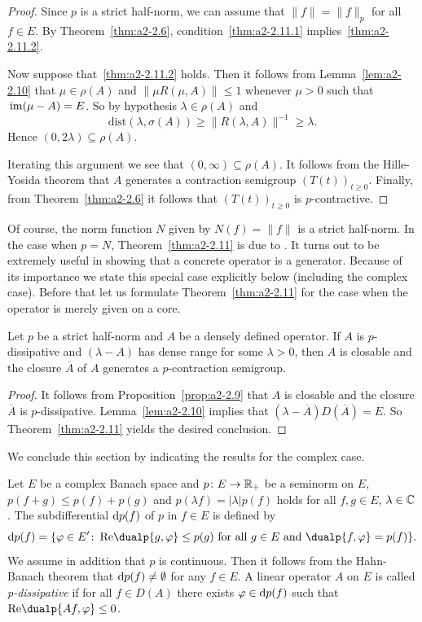\begin{proof}
Since $p$ is a strict half-norm, we can assume that $\|f\| = \|f\|_{p}$ for all $f \in E$.
By Theorem~\ref{thm:a2-2.6}, condition~\ref{thm:a2-2.11.1} implies~\ref{thm:a2-2.11.2}. 

Now suppose that~\ref{thm:a2-2.11.2}  holds.
Then it follows from Lemma~\ref{lem:a2-2.10}   
that $\mu \in \rho(A)$ and $\|\mu R(\mu,A)\| \leq 1$ whenever $\mu > 0$ such that $\mathop{}\mathrm{im}(\mu-A) = E$.
So by hypothesis $\lambda \in \rho(A)$ and 
%
\[
	\mathrm{dist}(\lambda,\sigma(A)) \geq \|R(\lambda,A)\|^{-1} \geq \lambda .
\]
%
Hence $(0,2\lambda) \subseteq \rho(A)$.

Iterating this argument we see that $(0,\infty) \subseteq \rho(A)$.
It follows from the Hille-Yosida theorem that $A$ generates a contraction semigroup $(T(t))_{t\geq 0}$.
Finally, from Theorem~\ref{thm:a2-2.6} it follows that $(T(t))_{t\geq 0}$ is $p$-contractive.
\end{proof}
Of course, the norm function $N$ given by $N(f) = \|f\|$ is a strict half-norm.
In the case when $p = N$, Theorem~\ref{thm:a2-2.11}    
is due to \textcite{lumerphillips:1961}.
It turns out to be extremely useful in showing that a concrete operator is a generator.
Because of its importance we state this special case explicitly below (including the complex case).
Before that let us formulate Theorem~\ref{thm:a2-2.11}   
for the case when the operator is merely given on a core.
\begin{corollary}\label{cor:a2-2.12}
Let $p$ be a strict half-norm and $A$ be a densely defined operator.
If\/ $A$ is $p$-dissipative and $(\lambda - A)$ has dense range for some $\lambda > 0$, then $A$ is closable and the closure $\overline{A}$ of\/ $A$ generates a $p$-contraction semigroup.
\end{corollary}
\begin{proof}
It follows from Proposition~\ref{prop:a2-2.9} that $A$ is closable and the closure $\overline{A}$ is $p$-dissipative.
Lemma~\ref{lem:a2-2.10} implies that $(\lambda- \overline{A})D(\overline{A}) = E$.
So Theorem~\ref{thm:a2-2.11} yields the desired conclusion.
\end{proof}
We conclude this section by indicating the results for the complex case.

Let $E$ be a complex Banach space and $p \colon E \to \mathbb{R}_{+}$ 
be a seminorm on $E$, \ie $p(f + g) \leq p(f) + p(g)$ and $p(\lambda f) = |\lambda|p(f)$ holds for all $f, g \in E$, $\lambda \in \mathbb{C}$.
The subdifferential $\mathop{}\!\mathrm{d}{p}(f)$ of\/ $p$ in $f \in E$ is defined by
\begin{equation}\label{eq:a2-4.15}
\ddp(f) = \{\phi \in E' \colon \Re\dualp{g,\phi} \leq p(g) \text{ for all } g \in E \text{ and } \dualp{f,\phi} = p(f)\}.
\end{equation}
We assume in addition that $p$ is continuous.
Then it follows from the Hahn-Banach theorem that $\mathop{}\!\mathrm{d}{p}(f) \neq \emptyset$ for any $f \in E$.
A linear operator $A$ on $E$ is called \emph{p-dissipative} if for all $f \in D(A)$ there exists $\phi \in \ddp(f)$ such that $\Re\dualp{Af,\phi} \leq 0$.

